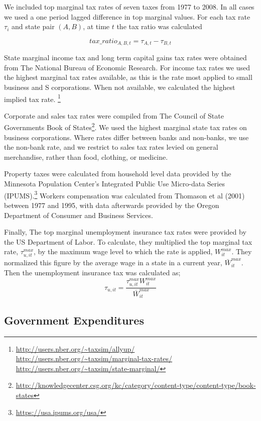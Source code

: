We included top marginal tax rates of seven taxes from 1977 to 2008. In all cases we used a one period lagged difference in top marginal values. For each tax rate $\tau_{i}$ and state pair $(A,B)$, at time $t$ the tax ratio was calculated 

\begin{equation} tax\_ratio_{A,B,t} = \tau_{A,t}-\tau_{B,t} \end{equation}

State marginal income tax and long term capital gains tax rates were obtained from The National Bureau of Economic Research. For income tax rates we used the highest marginal tax rates available, as this is the rate most applied to small business and S corporations. When not available, we calculated the highest implied tax rate. \footnote{\url{http://users.nber.org/~taxsim/allyup/} \url{http://users.nber.org/~taxsim/marginal-tax-rates/} \url{http://users.nber.org/~taxsim/state-marginal/}}

Corporate and sales tax rates were compiled from The Council of State Governments Book of States\footnote{\url{http://knowledgecenter.csg.org/kc/category/content-type/content-type/book-states}}. We used the highest marginal state tax rates on business corporations. Where rates differ between banks and non-banks, we use the non-bank rate, and we restrict to sales tax rates levied on general merchandise, rather than food, clothing, or medicine. 

Property taxes were calculated from household level data provided by the Minnesota Population Center's Integrated Public Use Micro-data Series (IPUMS).\footnote{\url{https://usa.ipums.org/usa/}} Workers compensation was calculated from Thomason et al (2001) between 1977 and 1995, with data afterwards provided by the Oregon Department of Consumer and Business Services. 

Finally, The top marginal unemployment insurance tax rates were provided by the US Department of Labor. To calculate, they multiplied the top marginal tax rate, $\tau_{u,it}^{max}$, by the maximum wage level to which the rate is applied, $W_{it}^{max}$. They normalized this figure by the average wage in a state in a current year, $\bar W_{it}^{max}$. Then the unemployment insurance tax was calculated as;
\begin{equation} \tau_{u,it} = \frac{\tau_{u,it}^{max}W_{it}^{max}}{\bar W_{it}^{max}}\end{equation}

\subsection{Government Expenditures}

